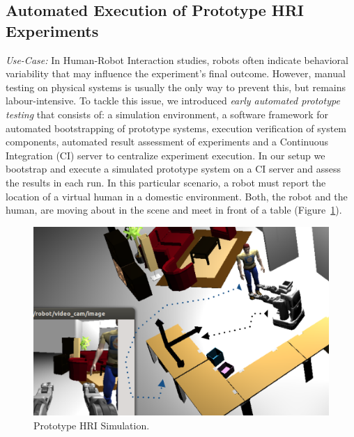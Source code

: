 \documentclass[conference]{IEEEtran}
\begin{document}
\subsection{Automated Execution of Prototype HRI Experiments}
\label{scenario1}

\emph{Use-Case:} In Human-Robot Interaction studies, robots often indicate
behavioral variability that may influence the experiment's final outcome.
However, manual testing on physical systems is usually the only way to prevent
this, but remains labour-intensive. To tackle this issue, we introduced
\emph{early automated prototype testing} \cite{2645922} that consists of: a
simulation environment, a software framework for automated bootstrapping of
prototype systems, execution verification of system components, automated result
assessment of experiments \cite{2563606} and a Continuous Integration (CI)
\cite{duvall2007continuous} server to centralize experiment execution. In our
setup we bootstrap and execute a simulated prototype system on a CI server and
assess the results in each run. In this particular scenario, a robot must report
the location of a virtual human in a domestic environment. Both, the robot and
the human, are moving about in the scene and meet in front of a table
(Figure~\ref{fig|proto}).

\begin{figure}[H]
      \centering
      \includegraphics[width=0.9\linewidth]{proto-setup.png}
      \caption{Prototype HRI Simulation.}
      \label{fig|proto}
\end{figure}
\end{document}
